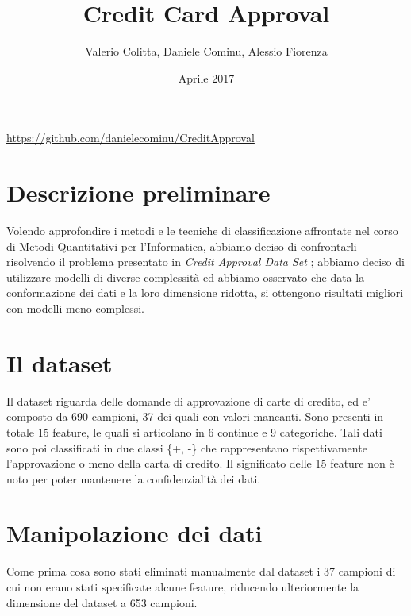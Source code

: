 \documentclass[a4paper,8pt]{article}
\begin{document}
\title{Credit Card Approval}
\author{Valerio Colitta, Daniele Cominu, Alessio Fiorenza}
\date{Aprile 2017}
\maketitle

\url{https://github.com/danielecominu/CreditApproval}
\begin{multicols}{2}

\section{Descrizione preliminare}
Volendo approfondire i metodi e le tecniche di classificazione affrontate nel corso di Metodi Quantitativi per l'Informatica, abbiamo deciso di confrontarli risolvendo il problema presentato in \emph{Credit Approval Data Set} \cite{Dataset}; abbiamo deciso di utilizzare modelli di diverse complessità ed abbiamo osservato che data la conformazione dei dati e la loro dimensione ridotta, si ottengono risultati migliori con modelli meno complessi. 

\section{Il dataset}
Il dataset riguarda delle domande di approvazione di carte di credito, ed e' composto da 690 campioni, 37 dei quali con valori mancanti. Sono presenti in totale 15 feature, le quali si articolano in 6 continue e 9 categoriche. Tali dati sono poi classificati in due classi \{+, -\} che rappresentano rispettivamente l'approvazione o meno della carta di credito.
Il significato delle 15 feature non è noto per poter mantenere la confidenzialità dei dati.

\section{Manipolazione dei dati}
Come prima cosa sono stati eliminati manualmente dal dataset i 37 campioni di cui non erano stati specificate alcune feature, riducendo ulteriormente la dimensione del dataset a 653 campioni.\\

\end{multicols}
\end{document}
